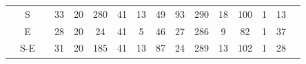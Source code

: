 \documentclass[12pt,bibliography=oldstyle,DIV=12,parskip=half-]{scrreprt}
\begin{document}
\begin{table}[h]
\begin{tabular}{@{}ccc@{}SSSSSSSSSSSSS@{}}
    \midrule
&{S}  &&   33 & 20&  280 &    41 &    13 &    49 &    93 &   290 &    18 &   100 &     1 &    13 \\
&{E}  &&   28 & 20&   24 &    41 &     5 &    46 &    27 &   286 &     9 &    82 &     1 &    37 \\
&{S-E}&&   31 & 20&  185 &    41 &    13 &    87 &    24 &   289 &    13 &   102 &     1 &    28 \\

\end{tabular}
\end{table}
\end{document}
